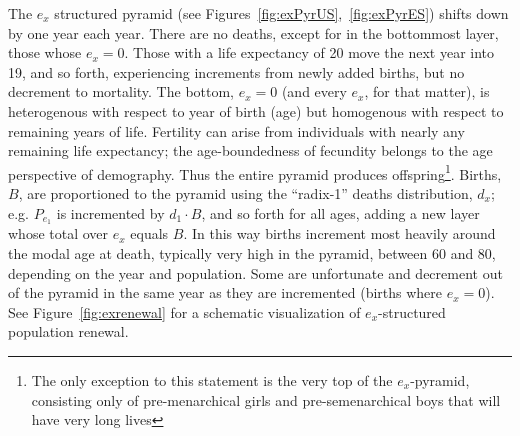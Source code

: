 \label{sec:exrenewal}
The $e_x$ structured pyramid (see Figures~\ref{fig:exPyrUS},~\ref{fig:exPyrES})
shifts down by one year each year. There are no deaths, except for in 
the bottommost layer, those whose $e_x = 0$. Those with a life
expectancy of 20 move the next year into 19, and so forth, experiencing
increments from newly added births, but no decrement to mortality. The bottom,
$e_x = 0$ (and every $e_x$, for that matter), is heterogenous with 
respect to year of birth (age) but homogenous with respect to remaining 
years of life. Fertility can arise from individuals with nearly any remaining life
expectancy; the age-boundedness of fecundity belongs to the age
perspective of demography. Thus the entire pyramid produces offspring\footnote{The only exception
to this statement is the very top of the $e_x$-pyramid, consisting only of
pre-menarchical girls and pre-semenarchical boys that will have very long
lives}. Births, $B$, are proportioned to the pyramid using the ``radix-1''
deaths distribution, $d_x$; e.g. $P_{e_1}$ is incremented by $d_1 \cdot B$, and
so forth for all ages, adding a new layer whose total over $e_x$ equals $B$. In this way births
increment most heavily around the modal age at death, typically very high in the
pyramid, between 60 and 80, depending on the year and population. Some are
unfortunate and decrement out of the pyramid in the same year as they are
incremented (births where $e_x = 0$). See Figure~\ref{fig:exrenewal} for a
schematic visualization of $e_x$-structured population renewal.